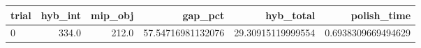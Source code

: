 \begin{tabular}{lrrrrr}
\hline
trial & hyb_int & mip_obj & gap_pct & hyb_total & polish_time \\ \hline
0 & 334.0 & 212.0 & 57.54716981132076 & 29.30915119999554 & 0.6938309669494629 \\
\hline
\end{tabular}

